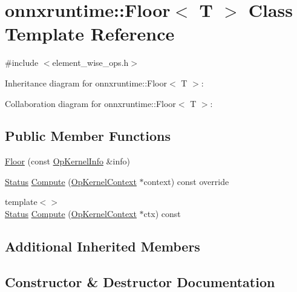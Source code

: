 \hypertarget{classonnxruntime_1_1Floor}{}\section{onnxruntime\+:\+:Floor$<$ T $>$ Class Template Reference}
\label{classonnxruntime_1_1Floor}


{\ttfamily \#include $<$element\+\_\+wise\+\_\+ops.\+h$>$}



Inheritance diagram for onnxruntime\+:\+:Floor$<$ T $>$\+:


Collaboration diagram for onnxruntime\+:\+:Floor$<$ T $>$\+:
\subsection*{Public Member Functions}
\begin{DoxyCompactItemize}
\item 
\mbox{\hyperlink{classonnxruntime_1_1Floor_a5f45f8910dfca7a0437fd5da249c9e0a}{Floor}} (const \mbox{\hyperlink{classonnxruntime_1_1OpKernelInfo}{Op\+Kernel\+Info}} \&info)
\item 
\mbox{\hyperlink{classonnxruntime_1_1common_1_1Status}{Status}} \mbox{\hyperlink{classonnxruntime_1_1Floor_a76529818dfe33e06fca8aa32d6c40d93}{Compute}} (\mbox{\hyperlink{classonnxruntime_1_1OpKernelContext}{Op\+Kernel\+Context}} $\ast$context) const override
\item 
{\footnotesize template$<$$>$ }\\\mbox{\hyperlink{classonnxruntime_1_1common_1_1Status}{Status}} \mbox{\hyperlink{classonnxruntime_1_1Floor_a1cd580a5b6c87c16122ece54ac9a9b02}{Compute}} (\mbox{\hyperlink{classonnxruntime_1_1OpKernelContext}{Op\+Kernel\+Context}} $\ast$ctx) const
\end{DoxyCompactItemize}
\subsection*{Additional Inherited Members}


\subsection{Constructor \& Destructor Documentation}
\mbox{\label{classonnxruntime_1_1Floor_a5f45f8910dfca7a0437fd5da249c9e0a}} 
